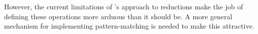 However, the current limitations of \Meta's approach to reductions make the job of defining these operations more arduous than it should be. A more general mechanism for implementing pattern-matching is needed to make this attractive.



